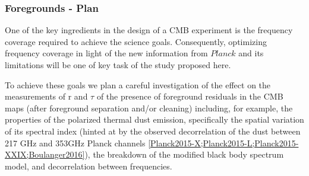 

\subsubsection{Foregrounds - Plan}




One of the key ingredients in the design of a CMB experiment is the frequency coverage required to achieve the science goals. Consequently, optimizing frequency coverage in light of the new information from $Planck$ and its limitations will be one of key task of the study proposed here. 

To achieve these goals we plan a careful investigation of the effect on the measurements of r and $\tau$ of the presence of foreground residuals in the CMB maps (after foreground separation and/or cleaning) including, for example, the properties of the polarized thermal dust emission, specifically the spatial variation of its spectral index (hinted at by the observed decorrelation of the dust between 217 GHz and 353GHz Planck channels \ref{Planck2015-X;Planck2015-L;Planck2015-XXIX;Boulanger2016}), the breakdown of the modified black body spectrum model, and decorrelation between frequencies. 

